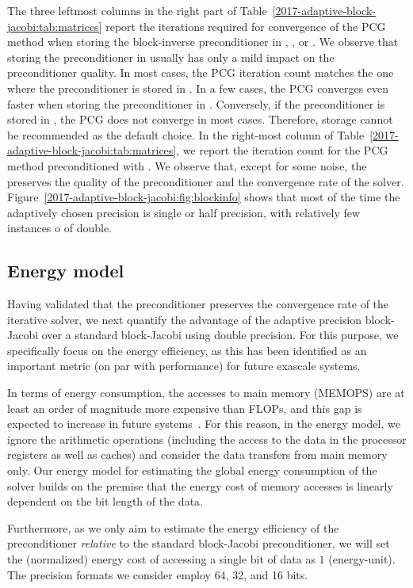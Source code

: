 The three leftmost columns in the right part of Table~\ref{2017-adaptive-block-jacobi:tab:matrices} report
the iterations required for convergence of  the PCG method when storing the
block-inverse preconditioner in \fpd, \fps, or \fph. We observe
that storing the preconditioner in \fps usually has only a mild impact on the
preconditioner quality. In most cases, the PCG iteration count matches the one
where the preconditioner is stored in \fpd. In a few cases, the PCG converges
even faster when storing the preconditioner in \fps. Conversely, if
the preconditioner is stored in \fph, the PCG does not converge in
most cases. Therefore, \fph storage cannot be recommended as the
default choice. In the right-most column of Table~\ref{2017-adaptive-block-jacobi:tab:matrices}, we
report the iteration count for the PCG method preconditioned with \apbj. We
observe that, except for some noise, the \apbj preserves the quality of the
preconditioner and the convergence rate of the \fpd solver.
Figure~\ref{2017-adaptive-block-jacobi:fig:blockinfo} shows that most of the time the adaptively
chosen precision is single or half precision, with relatively few instances
o of double.

\subsection{Energy model}

Having validated that the \apbj preconditioner preserves the convergence rate of
the iterative solver, we next quantify the advantage of the adaptive precision
block-Jacobi over a standard block-Jacobi using double precision. For this
purpose, we specifically focus on the  energy efficiency, as this has been
identified as an important metric (on par with performance) for future exascale
systems.

In terms of energy consumption, the accesses to main memory (MEMOPS)
are at least an order
of magnitude more expensive than FLOPs, and this gap is
expected to increase in future systems~\cite{shalf}.
For this reason, in the energy model, we ignore the arithmetic operations
(including the access to the data in the processor registers as well as caches)
and consider the data transfers from main memory only. Our energy model for
estimating the global energy consumption of the solver builds on the premise
that the energy cost of memory accesses is linearly dependent on the bit length
of the data.

Furthermore, as we only aim to estimate the energy efficiency of the \apbj
preconditioner \textit{relative} to the standard \fpd block-Jacobi
preconditioner, we will set the (normalized) energy cost of accessing a single
bit of data as $1$ (energy-unit). The precision formats we consider employ 64, 
32,
and 16 bits.

